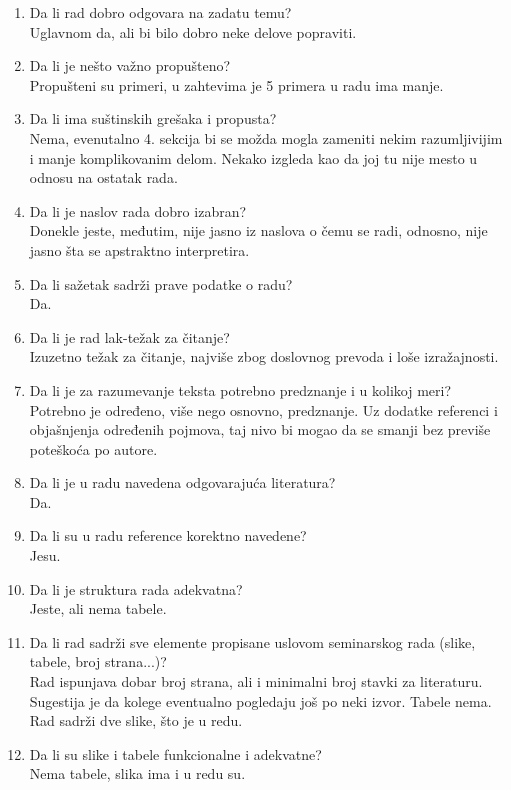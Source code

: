 \documentclass[a4paper]{report}
\begin{document}
\begin{enumerate}
\item Da li rad dobro odgovara na zadatu temu?\\Uglavnom da, ali bi bilo dobro neke delove popraviti.
\item Da li je nešto važno propušteno?\\ Propušteni su primeri, u zahtevima je 5 primera u radu ima manje.
\item Da li ima suštinskih grešaka i propusta?\\ Nema, evenutalno 4. sekcija bi se možda mogla zameniti nekim razumljivijim i manje komplikovanim delom. Nekako izgleda kao da joj tu nije mesto u odnosu na ostatak rada.
\item Da li je naslov rada dobro izabran?\\ Donekle jeste, međutim, nije jasno iz naslova o čemu se radi, odnosno, nije jasno šta se apstraktno interpretira.
\item Da li sažetak sadrži prave podatke o radu?\\ Da.
\item Da li je rad lak-težak za čitanje?\\Izuzetno težak za čitanje, najviše zbog doslovnog prevoda i loše izražajnosti.
\item Da li je za razumevanje teksta potrebno predznanje i u kolikoj meri?\\ Potrebno je određeno, više nego osnovno, predznanje. Uz dodatke referenci i objašnjenja određenih pojmova, taj nivo bi mogao da se smanji bez previše poteškoća po autore.
\item Da li je u radu navedena odgovarajuća literatura?\\ Da.
\item Da li su u radu reference korektno navedene?\\Jesu.
\item Da li je struktura rada adekvatna?\\Jeste, ali nema tabele.
\item Da li rad sadrži sve elemente propisane uslovom seminarskog rada (slike, tabele, broj strana...)?\\ Rad ispunjava dobar broj strana, ali i minimalni broj stavki za literaturu. Sugestija je da kolege eventualno pogledaju još po neki izvor. Tabele nema. Rad sadrži dve slike, što je u redu. 
\item Da li su slike i tabele funkcionalne i adekvatne?\\ Nema tabele, slika ima i u redu su.
\end{enumerate}
\end{document}
